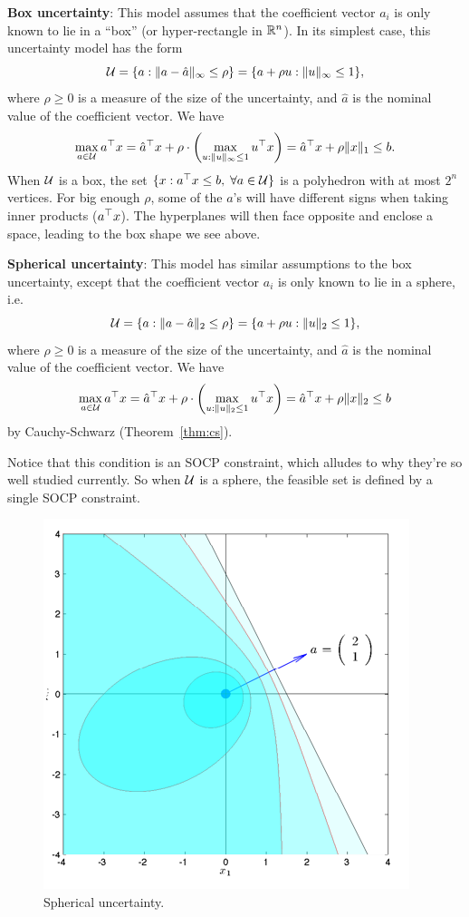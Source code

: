 \documentclass[11 pt]{scrartcl}
\begin{document}
\begin{itemize}
    \ii \textbf{Box uncertainty}: This model assumes that the coefficient vector $a_i$ is only known to lie in a ``box'' (or hyper-rectangle in $\mathbb R^n$). 
    In its simplest case, this uncertainty model has the form 
    \[ \mathcal U = \{a : \|a-\hat{a}\|_\infty \leq \rho\} = \{a + \rho u : \|u\|_\infty \leq 1\},\] 
    where $\rho \geq 0$ is a measure of the size of the uncertainty, and $\hat{a}$ is the nominal value of the coefficient vector. 
    We have 
    \[ \max_{a\in \mathcal U} a^\top x = \hat{a}^\top x + \rho\cdot \left(\max_{u:\|u\|_\infty \leq 1} u^\top x\right) = \hat{a}^\top x + \rho\|x\|_1 \leq b.\] 
    When $\mathcal U$ is a box, the set $\{x:a^\top x \leq b, \; \forall a\in\mathcal U\}$ is a polyhedron with at most $2^n$ vertices.
    For big enough $\rho$, some of the $a$'s will have different signs when taking inner products ($a^\top x$). 
    The hyperplanes will then face opposite and enclose a space, leading to the box shape we see above.

    \ii \textbf{Spherical uncertainty}: This model has similar assumptions to the box uncertainty, except that the coefficient vector $a_i$ is only known to lie in a sphere, i.e. 
    \[ \mathcal U = \{a : \|a-\hat{a}\|_2 \leq \rho\} = \{a + \rho u : \|u\|_2 \leq 1\},\] 
    where $\rho \geq 0$ is a measure of the size of the uncertainty, and $\hat{a}$ is the nominal value of the coefficient vector. 
    We have 
    \[ \max_{a\in \mathcal U} a^\top x = \hat{a}^\top x + \rho\cdot \left(\max_{u:\|u\|_2 \leq 1} u^\top x\right) = \hat{a}^\top x + \rho\|x\|_2 \leq b\] 
    by Cauchy-Schwarz (Theorem~\ref{thm:cs}). 

    Notice that this condition is an SOCP constraint, which alludes to why they're so well studied currently. 
    So when $\mathcal U$ is a sphere, the feasible set is defined by a single SOCP constraint. 

    \begin{figure}[!htb]
        \centering
        \includegraphics[scale=0.7]{spherical_uncertainty.png}
        \caption{Spherical uncertainty.}
    \end{figure}


\end{itemize}
\end{document}
